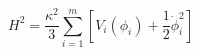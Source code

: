 \begin{equation}
\label{3E}
H^2=\frac{\kappa ^2}{3}\sum_{i=1}^{m}[V_i(\phi
_i)+\frac{1}{2}\dot{\phi}_i^2]
\end{equation}

